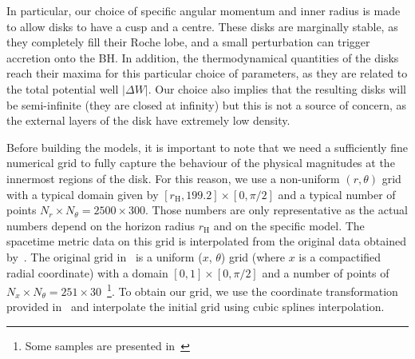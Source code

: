 \documentclass[twocolumn,aps,showpacs,showkeys,prd,superscriptaddress,byrevtex, amsmath]{revtex4-1}
\begin{document}
In particular, our choice of specific angular momentum and inner radius is made to allow disks to have a cusp and a centre. These disks are marginally stable, as they completely fill their Roche lobe, and a small perturbation can trigger accretion onto the BH. In addition, the thermodynamical quantities of the disks reach their maxima for this particular choice of parameters, as they are related to the total potential well $|\Delta W|$. Our choice also implies that the resulting disks will be semi-infinite (they are closed at infinity) but this is not a source of concern, as the external layers of the disk have extremely low density.

Before building the models, it is important to note that we need a sufficiently fine numerical grid to fully capture the behaviour of the physical magnitudes at the innermost regions of the disk. For this reason, we use a non-uniform $(r, \theta)$ grid with a typical domain given by $[r_{\mathrm{H}}, 199.2] \times [0, \pi/2]$ and a typical number of points $N_r \times N_{\theta} = 2500 \times 300$. Those numbers are only representative as the actual numbers depend on the horizon radius $r_{\mathrm{H}}$ and on the specific model. The spacetime metric data on this grid is interpolated from the original data obtained by~\cite{Herdeiro:2015b}. The original grid in~\cite{Herdeiro:2015b} is a uniform ($x$, $\theta$) grid (where $x$ is a compactified radial coordinate) with a domain $[0, 1] \times [0, \pi/2]$ and a number of points of $N_x \times N_{\theta} = 251 \times 30$~\footnote{Some samples are presented in~\cite{grav_web}}. To obtain our grid, we use the coordinate transformation provided in~\cite{grav_web} and interpolate the initial grid using cubic splines interpolation. 
\end{document}
